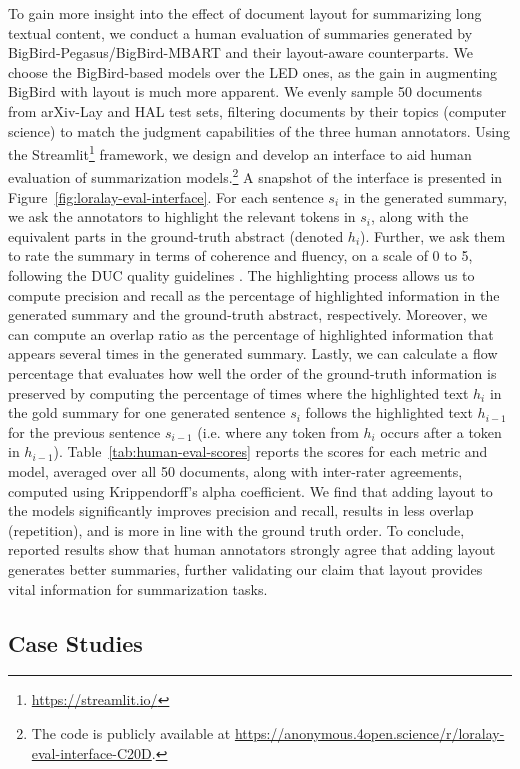 To gain more insight into the effect of document layout for summarizing long textual content, we conduct a human evaluation of summaries generated by BigBird-Pegasus/BigBird-MBART and their layout-aware counterparts. We choose the BigBird-based models over the LED ones, as the gain in augmenting BigBird with layout is much more apparent. We evenly sample 50 documents from arXiv-Lay and HAL test sets, filtering documents by their topics (computer science) to match the judgment capabilities of the three human annotators. 
Using the Streamlit\footnote{\url{https://streamlit.io/}} framework, we design and develop an interface to aid human evaluation of summarization models.\footnote{The code is publicly available at \url{https://anonymous.4open.science/r/loralay-eval-interface-C20D}.} A snapshot of the interface is presented in Figure~\ref{fig:loralay-eval-interface}.
For each sentence $s_i$ in the generated summary, we ask the annotators to highlight the relevant tokens in $s_i$, along with the equivalent parts in the ground-truth abstract (denoted $h_i$). Further, we ask them to rate the summary in terms of coherence and fluency, on a scale of 0 to 5, following the DUC quality guidelines \citep{dang2005overview}. The highlighting process allows us to compute precision and recall as the percentage of highlighted information in the generated summary and the ground-truth abstract, respectively. Moreover, we can compute an overlap ratio as the percentage of highlighted information that appears several times in the generated summary. Lastly, we can calculate a flow percentage that evaluates how well the order of the ground-truth information is preserved by computing the percentage of times where the highlighted text $h_i$ in the gold summary for one generated sentence $s_i$ follows the highlighted text $h_{i-1}$ for the previous sentence $s_{i-1}$ (i.e. where any token from $h_i$ occurs after a token in $h_{i-1}$).
Table~\ref{tab:human-eval-scores} reports the scores for each metric and model, averaged over all 50 documents, along with inter-rater agreements, computed using Krippendorff's alpha coefficient. We find that adding layout to the models significantly improves precision and recall, results in less overlap (repetition), and is more in line with the ground truth order. To conclude, reported results show that human annotators strongly agree that adding layout generates better summaries, further validating our claim that layout provides vital information for summarization tasks.

\subsection{Case Studies}

